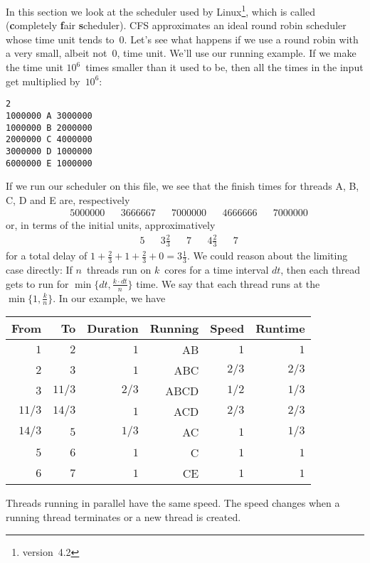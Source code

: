 In this section we look at the scheduler used by Linux\footnote{version~4.2},
  which is called  ({\bf c}ompletely {\bf f}air \textbf{s}cheduler).
CFS approximates an ideal round robin scheduler whose time unit tends to~$0$.
Let's see what happens if we use a round robin with a very small, albeit not~$0$,
  time unit.
We'll use our running example.
If we make the time unit $10^6$~times smaller than it used to be,
  then all the times in the input get multiplied by~$10^6$:
\begin{verbatim}
2
1000000 A 3000000
1000000 B 2000000
2000000 C 4000000
3000000 D 1000000
6000000 E 1000000
\end{verbatim}
If we run our scheduler on this file,
  we see that the finish times for threads A, B, C, D and E are, respectively
\begin{align*}
&5000000
&&3666667
&&7000000
&&4666666
&&7000000
\end{align*}
or, in terms of the initial units, approximatively
\begin{align*}
&5
&&3\textstyle\frac{2}{3}
&&7
&&4\textstyle\frac{2}{3}
&&7
\end{align*}
for a total delay of $1+\frac{2}{3}+1+\frac{2}{3}+0=3\frac{1}{3}$.
We could reason about the limiting case directly:
If $n$~threads run on $k$~cores for a time interval $dt$,
  then each thread gets to run for $\min\{dt,\frac{k\cdot dt}{n}\}$ time.
We say that each thread runs at the  $\min\{1,\frac{k}{n}\}$.
In our example, we have
\begin{center}
\begin{tabular}{@{}rrrrrr@{}}
\toprule
From & To & Duration & Running & Speed & Runtime \\
\midrule
$1$ & $2$ & $1$ & AB & $1$ & $1$ \\
$2$ & $3$ & $1$ & ABC & $2/3$ & $2/3$ \\
$3$ & $11/3$ & $2/3$ & ABCD & $1/2$ & $1/3$ \\
$11/3$ & $14/3$ & $1$ & ACD & $2/3$ & $2/3$ \\
$14/3$ & $5$ & $1/3$ & AC & $1$ & $1/3$ \\
$5$ & $6$ & $1$ & C & $1$ & $1$ \\
$6$ & $7$ & $1$ & CE & $1$ & $1$ \\
\bottomrule
\end{tabular}
\end{center}
Threads running in parallel have the same speed.
The speed changes when a running thread terminates or a new thread is created.

